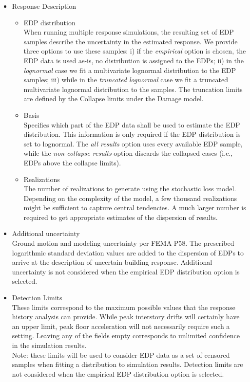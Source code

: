 \begin{itemize}
    \item Response Description
    \begin{itemize}
        \item EDP distribution\\
        When running multiple response simulations, the resulting set of EDP samples describe the uncertainty in the estimated response. We provide three options to use these samples: i) if the  \textit{empirical} option is chosen, the EDP data is used as-is, no distribution is assigned to the EDPs; ii) in the \textit{lognormal} case we fit a multivariate lognormal distribution to the EDP samples; iii) while in the \textit{truncated lognormal} case we fit a truncated multivariate lognormal distribution to the samples. The truncation limits are defined by the Collapse limits under the Damage model.
        \item Basis\\
        Specifies which part of the EDP data shall be used to estimate the EDP distribution. This information is only required if the EDP distribution is set to lognormal. The \textit{all results} option uses every available EDP sample, while the \textit{non-collapse results} option discards the collapsed cases (i.e., EDPs above the collapse limits).
        \item Realizations\\
        The number of realizations to generate using the stochastic loss model. Depending on the complexity of the model, a few thousand realizations might be sufficient to capture central tendencies. A much larger number is required to get appropriate estimates of the dispersion of results.
    \end{itemize}
    \item Additional uncertainty\\
    Ground motion and modeling uncertainty per FEMA P58. The prescribed logarithmic standard deviation values are added to the dispersion of EDPs to arrive at the description of uncertain building response. Additional uncertainty is not considered when the empirical EDP distribution option is selected.
    \item Detection Limits\\
    These limits correspond to the maximum possible values that the response history analysis can provide. While peak interstory drifts will certainly have an upper limit, peak floor acceleration will not necessarily require such a setting. Leaving any of the fields empty corresponds to unlimited confidence in the simulation results.\\
    Note: these limits will be used to consider EDP data as a set of censored samples when fitting a distribution to simulation results. Detection limits are not considered when the empirical EDP distribution option is selected.
\end{itemize}

